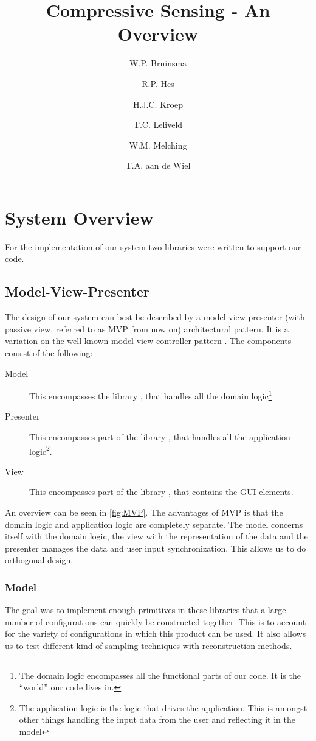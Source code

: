 \documentclass[a4paper, openany, oneside]{memoir}
\title{Compressive Sensing - An Overview}
\author{W.P. Bruinsma \and R.P. Hes \and H.J.C. Kroep \and T.C. Leliveld \and W.M. Melching \and T.A. aan de Wiel}
\begin{document}
\chapter{System Overview}
For the implementation of our system two libraries were written to support our code.

\section{Model-View-Presenter}
\label{sec:model-view-presenter}
The design of our system can best be described by a model-view-presenter (with passive view, referred to as MVP from now on) architectural pattern. It is a variation on the well known model-view-controller pattern \cite{syromiatnikov2014journey}. The components consist of the following:
\begin{description}
    \item[Model] This encompasses the library , that handles all the domain logic\footnote{The domain logic encompasses all the functional parts of our code. It is the ``world'' our code lives in.}.
    \item[Presenter] This encompasses part of the library , that handles all the application logic\footnote{The application logic is the logic that drives the application. This is amongst other things handling the input data from the user and reflecting it in the model}.
    \item[View] This encompasses part of the library , that contains the GUI elements.
\end{description}
An overview can be seen in \cref{fig:MVP}. The advantages of MVP is that the domain logic and application logic are completely separate. The model concerns itself with the domain logic, the view with the representation of the data and the presenter manages the data and user input synchronization. This allows us to do orthogonal design.

\begin{figure*}
    \centering
    
    \caption{Illustration of the MVP pattern as an hierarchical way of separating our system.}
    \label{fig:MVP}
\end{figure*}

\subsection{Model}
\label{sub:model}
The goal was to implement enough primitives in these libraries that a large number of configurations can quickly be constructed together. This is to account for the variety of configurations in which this product can be used. It also allows us to test different kind of sampling techniques with reconstruction methods.
\end{document}
